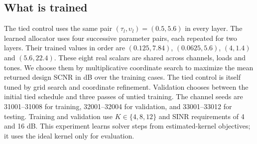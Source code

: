 \subsection{What is trained}
The tied control uses the same pair $(\tau_l,\upsilon_l)=(0.5,5.6)$ in every layer. The learned allocator uses four successive parameter pairs, each repeated for two layers. Their trained values in order are $(0.125,7.84)$, $(0.0625,5.6)$, $(4,1.4)$ and $(5.6,22.4)$. These eight real scalars are shared across channels, loads and tones. We choose them by multiplicative coordinate search to maximize the mean returned design SCNR in dB over the training cases. The tied control is itself tuned by grid search and coordinate refinement. Validation chooses between the initial tied schedule and three passes of untied training. The channel seeds are 31001--31008 for training, 32001--32004 for validation, and 33001--33012 for testing. Training and validation use $K\in\{4,8,12\}$ and SINR requirements of 4 and 16 dB. This experiment learns solver steps from estimated-kernel objectives; it uses the ideal kernel only for evaluation.
